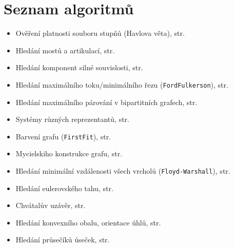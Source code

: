 \section{Seznam algoritmů}

\begin{itemize}
    \item Ověření platnosti souboru stupňů (Havlova věta), str. \pageref{alg:havlova-veta}
    \item Hledání mostů a artikulací, str. \pageref{alg:hledani-mostu}
    \item Hledání komponent silné souvislosti, str. \pageref{alg:hledani-silnych-komponent}
    \item Hledání maximálního toku/minimálního řezu (\texttt{FordFulkerson}), str. \pageref{alg:ford-fulkerson}
    \item Hledání maximálního párování v bipartitních grafech, str. \pageref{alg:parovani-v-bip-grafech}
    \item Systémy různých reprezentantů, str. \pageref{alg:srr-v-bip-grafech}
    \item Barvení grafu (\texttt{FirstFit}), str. \pageref{alg:first-fit}
    \item Mycielskiho konstrukce grafu, str. \pageref{alg:mycielskian}
    \item Hledání minimální vzdálenosti všech vrcholů (\texttt{Floyd-Warshall}), str. \pageref{alg:floyd-warshall}
    \item Hledání eulerovského tahu, str. \pageref{alg:euleruv-tah}
    \item Chvátalův uzávěr, str. \pageref{alg:chvataluv-uzaver}
    \item Hledání konvexního obalu, orientace úhlů, str. \pageref{alg:konvexni-obal}
    \item Hledání průsečíků úseček, str. \pageref{alg:pruseciky-usecek}
\end{itemize}